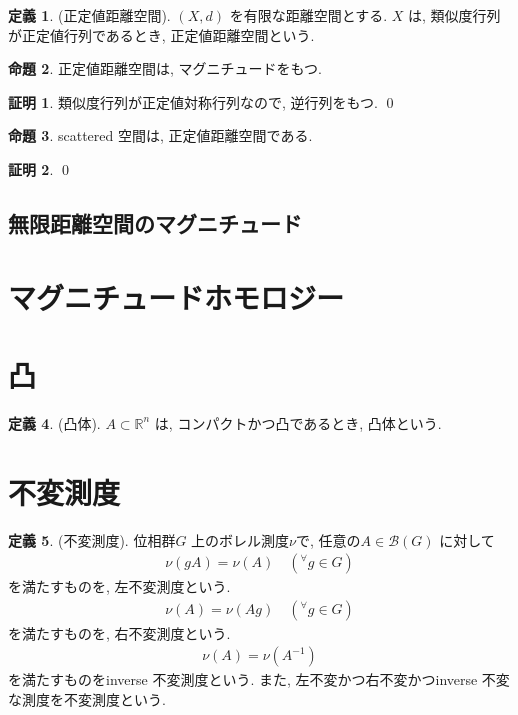 \documentclass[10pt, fleqn, label-section=none]{bxjsarticle}
\theoremstyle{definition}
\newtheorem{dfn}{定義}[section]
\newtheorem{prop}[dfn]{命題}
\newtheorem*{pf*}{証明}
\newcommand{\any}{{}^{\forall}}
\renewcommand{\;}{\, ; \,}
\begin{document}
\begin{dfn}(正定値距離空間). $(X, d)$ を有限な距離空間とする. $X$ は, 類似度行列が正定値行列であるとき, 正定値距離空間という.

\end{dfn}

\begin{prop}正定値距離空間は, マグニチュードをもつ.

\end{prop}
\begin{pf*}
類似度行列が正定値対称行列なので, 逆行列をもつ. 
\qed
\end{pf*}

\begin{prop}scattered 空間は, 正定値距離空間である.

\end{prop}
\begin{pf*}

\qed
\end{pf*}



\subsection{無限距離空間のマグニチュード}

\section{マグニチュードホモロジー}


\section{凸}

\begin{dfn}(凸体). $A \subset \mathbb R^n$ は, コンパクトかつ凸であるとき, 凸体という.

\end{dfn}




\section{不変測度}


\begin{dfn}(不変測度). 位相群$G$ 上のボレル測度$\nu$で,  任意の$A \in \mathcal B (G)$ に対して
\begin{align*} \nu(gA) = \nu(A) \quad (\any g \in G)\end{align*}
を満たすものを, 左不変測度という. 
\begin{align*} \nu(A) = \nu(Ag) \quad (\any g \in G)\end{align*}
を満たすものを, 右不変測度という. 
\begin{align*} \nu(A) = \nu(A^{-1}) \end{align*}
を満たすものをinverse 不変測度という. また, 左不変かつ右不変かつinverse 不変な測度を不変測度という.
\end{dfn}
\end{document}
